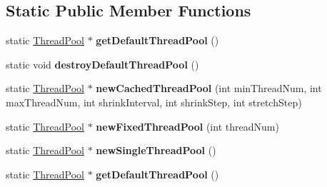 \subsection*{Static Public Member Functions}
\begin{DoxyCompactItemize}
\item 
\mbox{\label{classcocos2d_1_1experimental_1_1ThreadPool_a629a4ebd371a638fbcdac13a7a3b0bef}} 
static \hyperlink{classcocos2d_1_1experimental_1_1ThreadPool}{Thread\+Pool} $\ast$ {\bfseries get\+Default\+Thread\+Pool} ()
\item 
\mbox{\label{classcocos2d_1_1experimental_1_1ThreadPool_ac5c2b2def876a484c7f6c5a1c8560ed1}} 
static void {\bfseries destroy\+Default\+Thread\+Pool} ()
\item 
\mbox{\label{classcocos2d_1_1experimental_1_1ThreadPool_af09175a85f1394a4438dece620e6f07c}} 
static \hyperlink{classcocos2d_1_1experimental_1_1ThreadPool}{Thread\+Pool} $\ast$ {\bfseries new\+Cached\+Thread\+Pool} (int min\+Thread\+Num, int max\+Thread\+Num, int shrink\+Interval, int shrink\+Step, int stretch\+Step)
\item 
\mbox{\label{classcocos2d_1_1experimental_1_1ThreadPool_adf9216cfa84b9cba604003fddd1b72d7}} 
static \hyperlink{classcocos2d_1_1experimental_1_1ThreadPool}{Thread\+Pool} $\ast$ {\bfseries new\+Fixed\+Thread\+Pool} (int thread\+Num)
\item 
\mbox{\label{classcocos2d_1_1experimental_1_1ThreadPool_ac9dcad87434ac6876b08d664515821ed}} 
static \hyperlink{classcocos2d_1_1experimental_1_1ThreadPool}{Thread\+Pool} $\ast$ {\bfseries new\+Single\+Thread\+Pool} ()
\item 
\mbox{\label{classcocos2d_1_1experimental_1_1ThreadPool_aab28e432cc9c0fb3b48325548610e821}} 
static \hyperlink{classcocos2d_1_1experimental_1_1ThreadPool}{Thread\+Pool} $\ast$ {\bfseries get\+Default\+Thread\+Pool} ()
\item 
\mbox{\label{classcocos2d_1_1experimental_1_1ThreadPool_a01e8f6f52f50d601bbde88940c787d19}} 

\end{DoxyCompactItemize}
